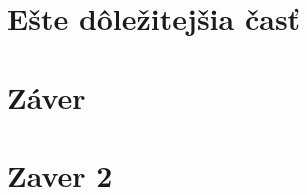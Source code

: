 \documentclass[10pt,twoside,slovak,a4paper, colorinlistoftodos]{article}
\begin{document}
\section{Ešte dôležitejšia časť} \label{dolezitejsia}




\section{Záver} \label{zaver} %



\section{Zaver 2}





 
\end{document}
